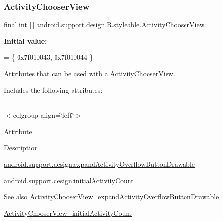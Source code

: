 \subsubsection{\texorpdfstring{Activity\+Chooser\+View}{ActivityChooserView}}
{\footnotesize\ttfamily final int \mbox{[}$\,$\mbox{]} android.\+support.\+design.\+R.\+styleable.\+Activity\+Chooser\+View\hspace{0.3cm}{\ttfamily [static]}}

{\bfseries Initial value\+:}
\begin{DoxyCode}
= \{
            0x7f010043, 0x7f010044
        \}
\end{DoxyCode}
Attributes that can be used with a Activity\+Chooser\+View. 

Includes the following attributes\+:

\tabulinesep=1mm
\begin{longtabu} spread 0pt [c]{*{0}{|X[-1]}|}
\hline
\end{longtabu}
$<$colgroup align=\char`\"{}left\char`\"{}$>$ 

Attribute

Description 

{\ttfamily \hyperlink{classandroid_1_1support_1_1design_1_1R_1_1styleable_adea9ca40f4470b412c930e60ace1ef3f}{android.\+support.\+design\+:expand\+Activity\+Overflow\+Button\+Drawable}}

{\ttfamily \hyperlink{classandroid_1_1support_1_1design_1_1R_1_1styleable_a588768b369a43efd493bc2a06b766e2a}{android.\+support.\+design\+:initial\+Activity\+Count}}

\begin{DoxySeeAlso}{See also}
\hyperlink{classandroid_1_1support_1_1design_1_1R_1_1styleable_adea9ca40f4470b412c930e60ace1ef3f}{Activity\+Chooser\+View\+\_\+expand\+Activity\+Overflow\+Button\+Drawable} 

\hyperlink{classandroid_1_1support_1_1design_1_1R_1_1styleable_a588768b369a43efd493bc2a06b766e2a}{Activity\+Chooser\+View\+\_\+initial\+Activity\+Count} 
\end{DoxySeeAlso}
\mbox{\label{classandroid_1_1support_1_1design_1_1R_1_1styleable_adea9ca40f4470b412c930e60ace1ef3f}} 
